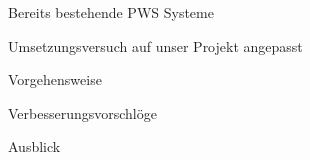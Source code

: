 
Bereits bestehende PWS Systeme

Umsetzungsversuch auf unser Projekt angepasst

Vorgehensweise

Verbesserungsvorschlöge

Ausblick 

